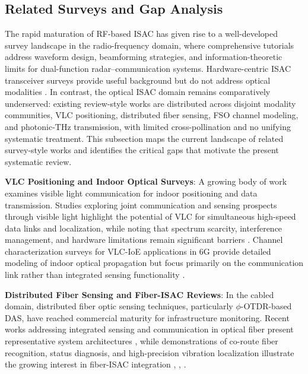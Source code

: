 \subsection{Related Surveys and Gap Analysis}
\label{sec:intro-related}

The rapid maturation of RF-based ISAC has given rise to a well-developed survey landscape in the radio-frequency domain, where comprehensive tutorials address waveform design, beamforming strategies, and information-theoretic limits for dual-function radar--communication systems. Hardware-centric ISAC transceiver surveys provide useful background but do not address optical modalities \cite{O_ISAC_161}. In contrast, the optical ISAC domain remains comparatively underserved: existing review-style works are distributed across disjoint modality communities, VLC positioning, distributed fiber sensing, FSO channel modeling, and photonic-THz transmission, with limited cross-pollination and no unifying systematic treatment. This subsection maps the current landscape of related survey-style works and identifies the critical gaps that motivate the present systematic review.

\textbf{VLC Positioning and Indoor Optical Surveys}: A growing body of work examines visible light communication for indoor positioning and data transmission. Studies exploring joint communication and sensing prospects through visible light highlight the potential of VLC for simultaneous high-speed data links and localization, while noting that spectrum scarcity, interference management, and hardware limitations remain significant barriers \cite{O_ISAC_068}. Channel characterization surveys for VLC-IoE applications in 6G provide detailed modeling of indoor optical propagation but focus primarily on the communication link rather than integrated sensing functionality \cite{O_ISAC_327}.

\textbf{Distributed Fiber Sensing and Fiber-ISAC Reviews}: In the cabled domain, distributed fiber optic sensing techniques, particularly $\phi$-OTDR-based DAS, have reached commercial maturity for infrastructure monitoring. Recent works addressing integrated sensing and communication in optical fiber present representative system architectures \cite{O_ISAC_006}, while demonstrations of co-route fiber recognition, status diagnosis, and high-precision vibration localization illustrate the growing interest in fiber-ISAC integration \cite{O_ISAC_041}, \cite{O_ISAC_090}, \cite{O_ISAC_189}.

